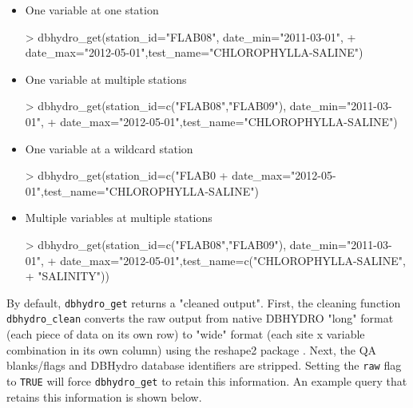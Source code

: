 \documentclass[12pt,notitlepage]{article}
\begin{document}
\begin{itemize}
\item One variable at one station

\begin{Schunk}
\begin{Sinput}
> dbhydro_get(station_id="FLAB08", date_min="2011-03-01",
+            date_max="2012-05-01",test_name="CHLOROPHYLLA-SALINE")
\end{Sinput}
\end{Schunk}

\item One variable at multiple stations

\begin{Schunk}
\begin{Sinput}
> dbhydro_get(station_id=c("FLAB08","FLAB09"), date_min="2011-03-01",
+            date_max="2012-05-01",test_name="CHLOROPHYLLA-SALINE")
\end{Sinput}
\end{Schunk}

\item One variable at a wildcard station

\begin{Schunk}
\begin{Sinput}
> dbhydro_get(station_id=c("FLAB0%
+            date_max="2012-05-01",test_name="CHLOROPHYLLA-SALINE")
\end{Sinput}
\end{Schunk}

\item Multiple variables at multiple stations

\begin{Schunk}
\begin{Sinput}
> dbhydro_get(station_id=c("FLAB08","FLAB09"), date_min="2011-03-01",
+            date_max="2012-05-01",test_name=c("CHLOROPHYLLA-SALINE",
+                                              "SALINITY"))
\end{Sinput}
\end{Schunk}

\end{itemize}

By default, \verb|dbhydro_get| returns a "cleaned output". First, the cleaning function \verb|dbhydro_clean| converts the raw output from native DBHYDRO "long" format (each piece of data on its own row) to "wide" format (each site x variable combination in its own column) using the reshape2 package \citep{reshape2}. Next, the QA blanks/flags and DBHydro database identifiers are stripped. Setting the \texttt{raw} flag to \texttt{TRUE} will force \verb|dbhydro_get| to retain this information. An example query that retains this information is shown below.
\end{document}
